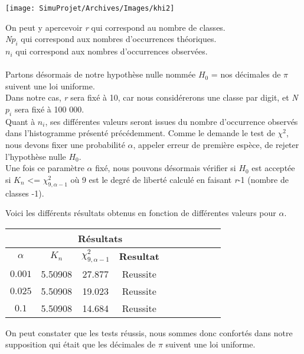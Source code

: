 \documentclass[french]{article}
\begin{document}
	\begin{center}
		\texttt{[image: SimuProjet/Archives/Images/khi2]}
	\end{center}
	
On peut y apercevoir \textit{r} qui correspond au nombre de classes. \\
\textit{N$p_{i}$} qui correspond aux nombres d'occurrences théoriques. \\
\textit{$n_{i}$} qui correspond aux nombres d'occurrences observées.
\\
\\
Partons désormais de notre hypothèse nulle nommée $H_{0}$ = {nos décimales de $\pi$ suivent une loi uniforme}.
\\
Dans notre cas, \textit{r} sera fixé à 10, car nous considérerons une classe par digit, et \textit{N$p_{i}$} sera fixé à 100 000.\\ 
Quant à \textit{$n_{i}$}, ses différentes valeurs seront issues du nombre d'occurrence observés dans l'histogramme présenté précédemment.
Comme le demande le test de \textbf{$\chi^{2}$}, nous devons fixer une probabilité $\alpha$, appeler erreur de première espèce, de rejeter l'hypothèse nulle $H_{0}$.
\\
Une fois ce paramètre $\alpha$ fixé, nous pouvons désormais vérifier si $H_{0}$ est acceptée
si $K_{n}$ <= $\chi^{2}_{9,\alpha-1}$ où 9 est le degré de liberté calculé en faisant \textit{r}-1 (nombre de classes -1).

Voici les différents résultats obtenus en fonction de différentes valeurs pour $\alpha$.
\\
\begin{longtable}{|c|c|c|c|c|c|c|c|c|c|}
	\hline
	& \multicolumn{3}{c|}{\textbf{Résultats}} \\ 
	\hline 
	\textbf{$\alpha$}  & $K_{n}$ & $\chi^{2}_{9,\alpha-1}$ & \textbf{Resultat} \\ 
	\hline 
	$$0.001$$ & 5.50908 & 27.877 & Reussite\\ 
	\hline 
	$$0.025$$ & 5.50908 & 19.023 & Reussite\\ 
	\hline 
	$$0.1$$ & 5.50908 & 14.684 & Reussite \\ 
	\hline 
\end{longtable}

On peut constater que les tests réussis, nous sommes donc confortés dans notre supposition qui était que les décimales de $\pi$ suivent une loi uniforme.
\\
\end{document}
